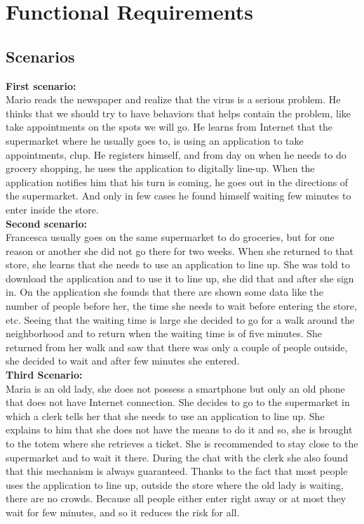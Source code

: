 \section{Functional Requirements}

\subsection{Scenarios}

\textbf{First scenario:}\\
Mario reads the newspaper and realize that the virus is a serious problem. He thinks that we should try to have behaviors that helps contain the problem, like take appointments on the spots we will go. He learns from Internet that the supermarket where he usually goes to, is using an application to take appointments, \gls{clup}. He registers himself, and from day on when he needs to do grocery shopping, he uses the application to digitally line-up. When the application notifies him that his turn is coming, he goes out in the directions of the supermarket. And only in few cases he found himself waiting few minutes to enter inside the store.\\

\textbf{Second scenario:}\\
Francesca usually goes on the same supermarket to do groceries, but for one reason or another she did not go there for two weeks. When she returned to that store, she learns that she needs to use an application to line up. She was told to download the application and to use it to line up, she did that and after she sign in. 
On the application she founds that there are shown some data like  the number of people before her, the time she needs to wait before entering the store, etc. 
Seeing that the waiting time is large she decided to go for a walk around the neighborhood and to return when the waiting time is of five minutes. She returned from her walk and saw that there was only a couple of people outside, she decided to wait and after few minutes she entered.\\

\textbf{Third Scenario:}\\
Maria is an old lady, she does not possess a smartphone but only an old phone that does not have Internet connection.
She decides to go to the supermarket in which a clerk tells her that she needs to use an application to line up. She explains to him that she does not have the means to do it and so, she is brought to the totem where she retrieves a ticket. She is recommended to stay close to the supermarket and to wait it there. During the chat with the clerk she also found that this mechanism is always guaranteed. 
Thanks to the fact that most people uses the application to line up, outside the store where the old lady is waiting, there are no crowds. Because all people either enter right away or at most they wait for few minutes, and so it reduces the risk for all.\\

